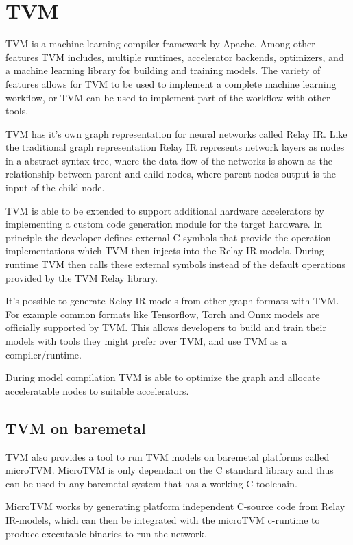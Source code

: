 \documentclass[12pt,a4paper,english
]{tunithesis}
\begin{document}
\section{TVM}
TVM is a machine learning compiler framework by Apache. Among other features TVM includes, multiple runtimes, accelerator backends, optimizers, and a machine learning library for building and training models. The variety of features allows for TVM to be used to implement a complete machine learning workflow, or TVM can be used to implement part of the workflow with other tools.

TVM has it's own graph representation for neural networks called Relay IR. Like the traditional graph representation Relay IR represents network layers as nodes in a abstract syntax tree, where the data flow of the networks is shown as the relationship between parent and child nodes, where parent nodes output is the input of the child node.

TVM is able to be extended to support additional hardware accelerators by implementing a custom code generation module for the target hardware. In principle the developer defines external C symbols that provide the operation implementations which TVM then injects into the Relay IR models. During runtime TVM then calls these external symbols instead of the default operations provided by the TVM Relay library.

It's possible to generate Relay IR models from other graph formats with TVM. For example common formats like Tensorflow, Torch and Onnx models are officially supported by TVM. This allows developers to build and train their models with tools they might prefer over TVM, and use TVM as a compiler/runtime.

During model compilation TVM is able to optimize the graph and allocate acceleratable nodes to suitable accelerators.~\parencite{TVM}

\subsection{TVM on baremetal}
TVM also provides a tool to run TVM models on baremetal platforms called microTVM. MicroTVM is only dependant on the C standard library and thus can be used in any baremetal system that has a working C-toolchain.

MicroTVM works by generating platform independent C-source code from Relay IR-models, which can then be integrated with the microTVM c-runtime to produce executable binaries to run the network.
\end{document}
